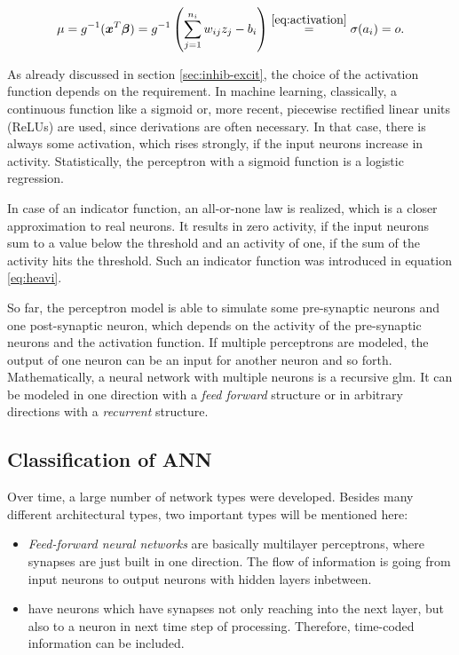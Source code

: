\begin{equation}
\label{eq:ann-model}
\mu = g^{-1}(\bm x^T \bm \beta) = g^{-1}\left(\sum_{j=1}^{n_i} w_{ij} z_j - b_i\right) \overset{\eqref{eq:activation}}{=} \sigma(a_i) = o.
\end{equation}

As already discussed in section \ref{sec:inhib-excit}, the choice of the activation function depends on the requirement. In machine learning, classically, a continuous function like a sigmoid or, more recent, piecewise rectified linear units (ReLUs) are used, since derivations are often necessary. In that case, there is always some activation, which rises strongly, if the input neurons increase in activity. Statistically, the perceptron with a sigmoid function is a logistic regression. 
 
In case of an indicator function, an all-or-none law is realized, which is a closer approximation to real neurons. It results in zero activity, if the input neurons sum to a value below the threshold and an activity of one, if the sum of the activity hits the threshold. Such an indicator function was introduced in equation \eqref{eq:heavi}.

So far, the perceptron model is able to simulate some pre-synaptic neurons and one post-synaptic neuron, which depends on the activity of the pre-synaptic neurons and the activation function. If multiple perceptrons are modeled, the output of one neuron can be an input for another neuron and so forth. Mathematically, a neural network with multiple neurons is a recursive \acl{glm}. It can be modeled in one direction with a \emph{feed forward} structure or in arbitrary directions with a \emph{recurrent} structure.

\subsection{Classification of ANN}

Over time, a large number of network types were developed. Besides many different architectural types, two important types will be mentioned here:

\begin{itemize}
\item \emph{Feed-forward neural networks} are basically multilayer perceptrons, where synapses are just built in one direction. The flow of information is going from input neurons to output neurons with hidden layers inbetween.
\item {} have neurons which have synapses not only reaching into the next layer, but also to a neuron in next time step of processing. Therefore, time-coded information can be included.
\end{itemize}

